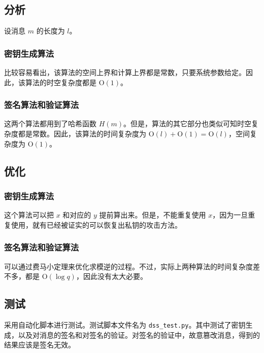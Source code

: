 \documentclass[12pt,a4paper]{article}
\begin{document}
\subsection*{分析}

设消息 $ m $ 的长度为 $ l $。

\subsubsection*{密钥生成算法}

比较容易看出，该算法的空间上界和计算上界都是常数，只要系统参数给定。因此，该算法的时空复杂度都是 $ \mathrm{O}(1) $。

\subsubsection*{签名算法和验证算法}

这两个算法都用到了哈希函数 $ H(m) $。但是，算法的其它部分也类似可知时空复杂度都是常数。因此，该算法的时间复杂度为 $ \mathrm{O}(l) + \mathrm{O}(1) = \mathrm{O}(l) $，空间复杂度为 $ \mathrm{O}(1) $。

\subsection*{优化}

\subsubsection*{密钥生成算法}

这个算法可以把 $ x $ 和对应的 $ y $ 提前算出来。但是，不能重复使用 $ x $，因为一旦重复使用，就有已经被证实的可以恢复出私钥的攻击方法。

\subsubsection*{签名算法和验证算法}

可以通过费马小定理来优化求模逆的过程。不过，实际上两种算法的时间复杂度差不多，都是 $ \mathrm{O}(\log q) $，因此没有太大必要。

\subsection*{测试}

采用自动化脚本进行测试。测试脚本文件名为 \verb|dss_test.py|。其中测试了密钥生成，以及对消息的签名和对签名的验证。对签名的验证中，故意篡改消息，得到的结果应该是签名无效。
\end{document}
